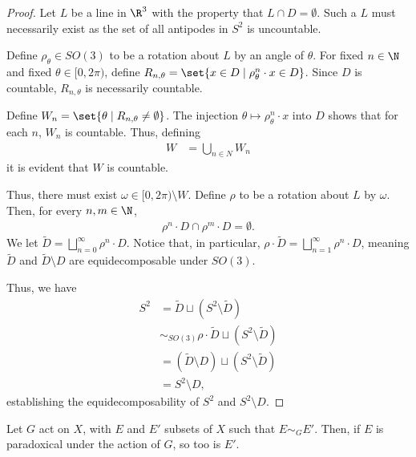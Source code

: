 \documentclass[10pt]{mypackage}
\begin{document}
\begin{proof}
  Let $L$ be a line in $\R^3$ with the property that $L \cap D = \emptyset$. Such a $L$ must necessarily exist as the set of all antipodes in $S^{2}$ is uncountable.\newline

  Define $\rho_{\theta}\in SO(3)$ to be a rotation about $L$ by an angle of $\theta$. For fixed $n\in \N$ and fixed $\theta\in [0,2\pi)$, define $R_{n,\theta} = \set{x\in D\mid \rho_{\theta}^{n}\cdot x\in D}$. Since $D$ is countable, $R_{n,\theta}$ is necessarily countable.\newline

  Define $W_{n} = \set{\theta\mid R_{n,\theta}\neq \emptyset}$. The injection $\theta \mapsto \rho^{n}_{\theta}\cdot x$ into $D$ shows that for each $n$, $W_n$ is countable. Thus, defining
  \begin{align*}
    W &= \bigcup_{n\in N}W_n
  \end{align*}
  it is evident that $W$ is countable.\newline

  Thus, there must exist $\omega \in [0,2\pi)\setminus W$. Define $\rho$ to be a rotation about $L$ by $\omega$. Then, for every $n,m\in \N$,
  \begin{align*}
    \rho^{n}\cdot D \cap \rho^{m}\cdot D = \emptyset.
  \end{align*}
  We let $\tilde{D} = \bigsqcup_{n=0}^{\infty}\rho^{n}\cdot D$. Notice that, in particular, $\rho\cdot\tilde{D} = \bigsqcup_{n=1}^{\infty}\rho^{n}\cdot D$, meaning $\tilde{D}$ and $\tilde{D}\setminus D$ are equidecomposable under $SO(3)$.\newline

  Thus, we have
  \begin{align*}
    S^{2} &= \tilde{D}\sqcup \left(S^2\setminus \tilde{D}\right)\\
          &\sim_{SO(3)} \rho\cdot \tilde{D}\sqcup\left(S^2\setminus \tilde{D}\right)\\
          &= \left(\tilde{D}\setminus D\right)\sqcup\left(S^2\setminus \tilde{D}\right)\\
          &= S^2\setminus D,
  \end{align*}
  establishing the equidecomposability of $S^2$ and $S^2\setminus D$.
\end{proof}
\begin{proposition}
  Let $G$ act on $X$, with $E$ and $E'$ subsets of $X$ such that $E \sim_{G}E'$. Then, if $E$ is paradoxical under the action of $G$, so too is $E'$.
\end{proposition}
\end{document}

